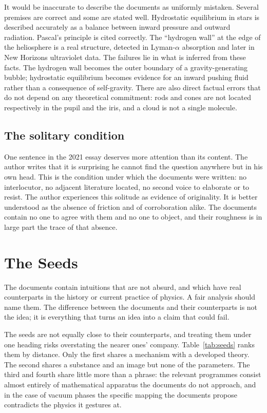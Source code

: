 \documentclass[11pt]{article}
\begin{document}
It would be inaccurate to describe the documents as uniformly mistaken. Several premises are correct and some are stated well. Hydrostatic equilibrium in stars is described accurately as a balance between inward pressure and outward radiation. Pascal's principle is cited correctly. The ``hydrogen wall'' at the edge of the heliosphere is a real structure, detected in Lyman-$\alpha$ absorption \cite{linsky1996} and later in New Horizons ultraviolet data. The failures lie in what is inferred from these facts. The hydrogen wall becomes the outer boundary of a gravity-generating bubble; hydrostatic equilibrium becomes evidence for an inward pushing fluid rather than a consequence of self-gravity. There are also direct factual errors that do not depend on any theoretical commitment: rods and cones are not located respectively in the pupil and the iris, and a cloud is not a single molecule.

\subsection{The solitary condition}

One sentence in the 2021 essay deserves more attention than its content. The author writes that it is surprising he cannot find the question anywhere but in his own head. This is the condition under which the documents were written: no interlocutor, no adjacent literature located, no second voice to elaborate or to resist. The author experiences this solitude as evidence of originality. It is better understood as the absence of friction and of corroboration alike. The documents contain no one to agree with them and no one to object, and their roughness is in large part the trace of that absence.

\section{The Seeds}

The documents contain intuitions that are not absurd, and which have real counterparts in the history or current practice of physics. A fair analysis should name them. The difference between the documents and their counterparts is not the idea; it is everything that turns an idea into a claim that could fail.

The seeds are not equally close to their counterparts, and treating them under one heading risks overstating the nearer ones' company. Table~\ref{tab:seeds} ranks them by distance. Only the first shares a mechanism with a developed theory. The second shares a substance and an image but none of the parameters. The third and fourth share little more than a phrase: the relevant programmes consist almost entirely of mathematical apparatus the documents do not approach, and in the case of vacuum phases the specific mapping the documents propose contradicts the physics it gestures at.
\end{document}
